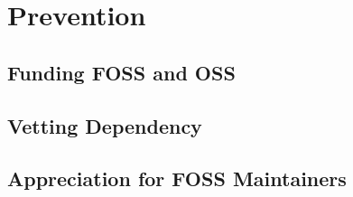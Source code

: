 \section{Prevention}
\subsection{Funding FOSS and OSS}
\subsection{Vetting Dependency}
\subsection{Appreciation for FOSS Maintainers}
